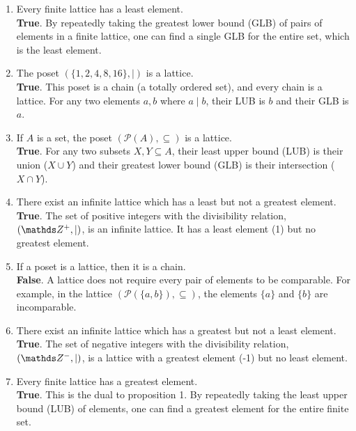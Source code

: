 \documentclass[10pt]{article}
\theoremstyle{definition}
\theoremstyle{plain}
\numberwithin{equation}{section}
\begin{document}
\begin{enumerate}
  \item Every finite lattice has a least element. \\
  \textbf{True}. By repeatedly taking the greatest lower bound (GLB) of pairs of elements in a finite lattice, one can find a single GLB for the entire set, which is the least element.

  \item The poset $(\{1,2,4,8,16\}, \mid)$ is a lattice. \\
  \textbf{True}. This poset is a chain (a totally ordered set), and every chain is a lattice. For any two elements $a,b$ where $a \mid b$, their LUB is $b$ and their GLB is $a$.

  \item If $A$ is a set, the poset $(\mathcal{P}(A), \subseteq)$ is a lattice. \\
  \textbf{True}. For any two subsets $X, Y \subseteq A$, their least upper bound (LUB) is their union ($X \cup Y$) and their greatest lower bound (GLB) is their intersection ($X \cap Y$).

  \item There exist an infinite lattice which has a least but not a greatest element. \\
  \textbf{True}. The set of positive integers with the divisibility relation, $(\setZ^{+}, \mid)$, is an infinite lattice. It has a least element (1) but no greatest element.

  \item If a poset is a lattice, then it is a chain. \\
  \textbf{False}. A lattice does not require every pair of elements to be comparable. For example, in the lattice $(\mathcal{P}(\{a, b\}), \subseteq)$, the elements $\{a\}$ and $\{b\}$ are incomparable.

  \item There exist an infinite lattice which has a greatest but not a least element. \\
  \textbf{True}. The set of negative integers with the divisibility relation, $(\setZ^{-}, \mid)$, is a lattice with a greatest element (-1) but no least element.

  \item Every finite lattice has a greatest element. \\
  \textbf{True}. This is the dual to proposition 1. By repeatedly taking the least upper bound (LUB) of elements, one can find a greatest element for the entire finite set.



\end{enumerate}
\end{document}
